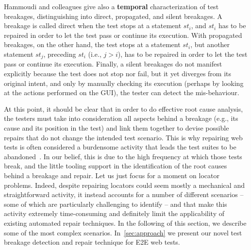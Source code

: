Hammoudi and colleagues give also a \textbf{temporal} characterization of test breakages, distinguishing into direct, propagated, and silent breakages. A breakage is called direct when the test stops at a statement $st_i$, and $st_i$ has to be repaired in order to let the test pass or continue its execution. With propagated breakages, on the other hand, the test stops at a statement $st_i$, but another statement $st_j$, preceding $st_i$ (i.e., $j > i$), has to be repaired in order to let the test pass or continue its execution. Finally, a silent breakages do not manifest explicitly because the test does not stop nor fail, but it yet diverges from its original intent, and only by manually checking its execution (perhaps by looking at the actions performed on the GUI), the tester can detect the mis-behaviour.

At this point, it should be clear that in order to do effective root cause analysis, the testers must take into consideration all aspects behind a breakage (e.g., its cause and its position in the test) and link them together to devise possible repairs that do not change the intended test scenario. This is why repairing web tests is often considered a burdensome activity that leads the test suites to be abandoned~\cite{Christophe2014}. In our belief, this is due to the high frequency at which those tests break, and the little tooling support in the identification of the root causes behind a breakage and repair.
%
Let us just focus for a moment on locator problems. Indeed, despite repairing locators could seem mostly a mechanical and straightforward activity, it instead accounts for a number of different scenarios -- some of which are particularly challenging to identify -- and that make this activity extremely time-consuming and 
definitely limit the applicability of existing automated repair techniques. In the following of this section, we describe some of the most complex scenarios. In~\autoref{sec:approach} we present our novel test breakage detection and repair technique for E2E web tests.


